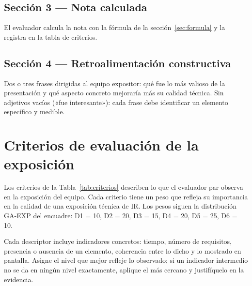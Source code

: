\documentclass[11pt]{article}
\begin{document}
\subsection{\textcolor{midblue}{Sección 3 --- Nota calculada}}

El evaluador calcula la nota con la fórmula de la sección~\ref{sec:formula} y la registra en la tabla de criterios.

\subsection{\textcolor{midblue}{Sección 4 --- Retroalimentación constructiva}}

Dos o tres frases dirigidas al equipo expositor: qué fue lo más valioso de la presentación y qué aspecto concreto mejoraría más su calidad técnica. Sin adjetivos vacíos («fue interesante»): cada frase debe identificar un elemento específico y medible.

\section{\textcolor{utegreendk}{Criterios de evaluación de la exposición}}

Los criterios de la Tabla~\ref{tab:criterios} describen lo que el evaluador par observa en la exposición del equipo. Cada criterio tiene un peso que refleja su importancia en la calidad de una exposición técnica de IR. Los pesos siguen la distribución GA-EXP del encuadre: D1 = 10, D2 = 20, D3 = 15, D4 = 20, D5 = 25, D6 = 10.

\begin{cajaaviso}[title=Indicadores observables y medibles]
	Cada descriptor incluye indicadores concretos: tiempo, número de requisitos, presencia o ausencia de un elemento, coherencia entre lo dicho y lo mostrado en pantalla. Asigne el nivel que mejor refleje lo observado; si un indicador intermedio no se da en ningún nivel exactamente, aplique el más cercano y justifíquelo en la evidencia.
\end{cajaaviso}
\end{document}
